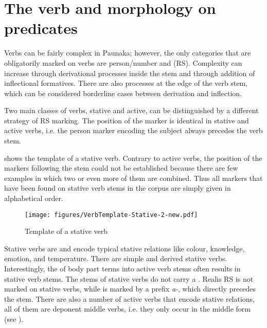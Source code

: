 

\chapter[The verb and morphology on predicates]{The verb and morphology on predicates}\label{sec:Verbs}

Verbs can be fairly complex in Paunaka; however, the only categories that are obligatorily marked on verbs are person/number and  (RS). Complexity can increase through derivational processes inside the stem and through addition of inflectional formatives. There are also processes at the edge of the verb stem, which can be considered borderline cases between derivation and inflection.

Two main classes of verbs, stative and active, can be distinguished by a different strategy of RS marking. The position of the  marker is identical in stative and active verbs, i.e. the person marker encoding the subject always precedes the verb stem.

 shows the template of a stative verb. Contrary to active verbs, the position of the markers following the stem could not be established because there are few examples in which two or even more of them are combined. Thus all markers that have been found on stative verb stems in the corpus are simply given in alphabetical order.

\begin{figure}
\texttt{[image: figures/VerbTemplate-Stative-2-new.pdf]}
\caption{Template of a stative verb}
\label{fig:VerbTemplate-Stative}
\end{figure}

Stative verbs are  and encode typical stative relations like colour, knowledge, emotion, and temperature. There are simple and derived stative verbs. Interestingly, the  of body part terms into active verb stems often results in stative verb stems. The stems of stative verbs do not carry a . Realis RS is not marked on stative verbs, while  is marked by a prefix \textit{a-}, which directly precedes the stem. There are also a number of active verbs that encode stative relations, all of them are deponent middle verbs, i.e. they only occur in the middle form (see ).


